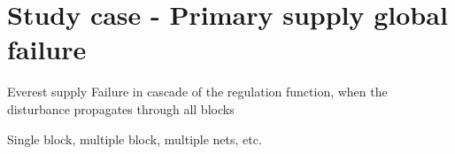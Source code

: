 \section{Study case - Primary supply global failure}
\label{sec:testchip_study}
Everest supply
Failure in cascade of the regulation function, when the disturbance propagates through all blocks

Single block, multiple block, multiple nets, etc. 
